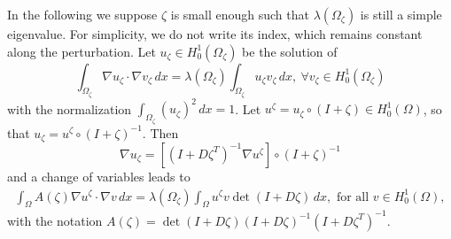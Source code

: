 In the following we suppose $\zeta$ is small enough such that $\lambda(\Omega_\zeta)$ is still a simple eigenvalue. For simplicity, we do not write its index, which remains constant along the perturbation. Let $u_\zeta \in H_0^1(\Omega_\zeta)$ be the solution of
\begin{equation}
\int_{\Omega_\zeta} \nabla u_\zeta \cdot \nabla v_\zeta \, dx= \lambda (\Omega_\zeta) \int_{\Omega_\zeta} u_\zeta v_\zeta \,dx, \ \forall v_\zeta \in H_0^1(\Omega_\zeta)
\label{eq:eig-problem-moved}
\end{equation}
with the normalization $\int_{\Omega_\zeta} (u_\zeta)^2\, dx = 1$. Let $u^\zeta = u_\zeta\circ (I+\zeta)\in H_0^1(\Omega)$, so that $u_\zeta = u^\zeta\circ(I+\zeta)^{-1}$. Then
\begin{equation}
\nabla u_\zeta = [(I+D\zeta^T)^{-1}\nabla u^\zeta ] \circ (I+\zeta)^{-1}
\label{eq:change-var-grad}
\end{equation}
and a change of variables leads to
\begin{eqnarray}
\int_\Omega A(\zeta) \nabla u^\zeta \cdot \nabla v \,dx = \lambda(\Omega_\zeta) \int_\Omega u^\zeta v \det(I+D\zeta) \,dx, \text{ for all } v \in H_0^1(\Omega),
\label{eq:eig-problem-fixed}
\end{eqnarray}
with the notation $A(\zeta) = \det(I+D\zeta)(I+D\zeta)^{-1}(I+D\zeta^T)^{-1}$.

